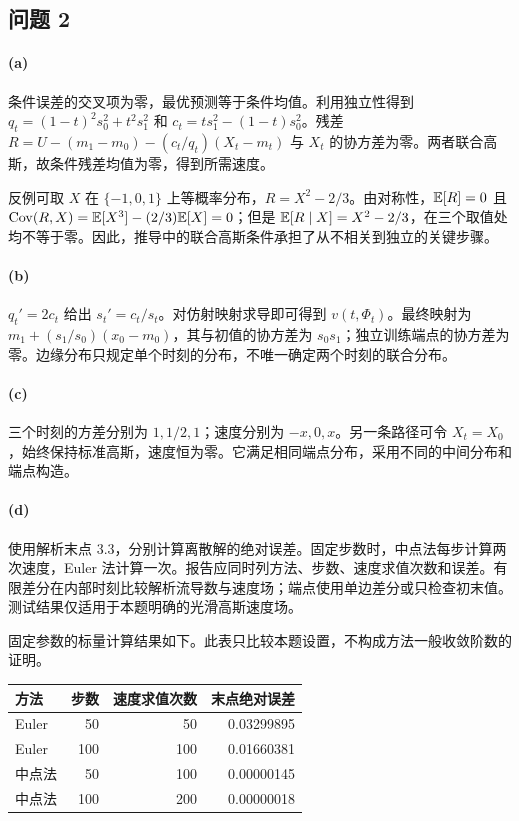 \subsection*{问题 2}
\paragraph{(a)}\label{sol:flow-a}
条件误差的交叉项为零，最优预测等于条件均值。利用独立性得到 $q_t=(1-t)^2s_0^2+t^2s_1^2$ 和 $c_t=ts_1^2-(1-t)s_0^2$。残差 $R=U-(m_1-m_0)-(c_t/q_t)(X_t-m_t)$ 与 $X_t$ 的协方差为零。两者联合高斯，故条件残差均值为零，得到所需速度。

反例可取 $X$ 在 $\{-1,0,1\}$ 上等概率分布，$R=X^2-2/3$。由对称性，$\mathbb E[R]=0$ 且 $\operatorname{Cov}(R,X)=\mathbb E[X^3]-(2/3)\mathbb E[X]=0$；但是 $\mathbb E[R\mid X]=X^2-2/3$，在三个取值处均不等于零。因此，推导中的联合高斯条件承担了从不相关到独立的关键步骤。

\paragraph{(b)}\label{sol:flow-b}
$q_t'=2c_t$ 给出 $s_t'=c_t/s_t$。对仿射映射求导即可得到 $v(t,\Phi_t)$。最终映射为 $m_1+(s_1/s_0)(x_0-m_0)$，其与初值的协方差为 $s_0s_1$；独立训练端点的协方差为零。边缘分布只规定单个时刻的分布，不唯一确定两个时刻的联合分布。

\paragraph{(c)}\label{sol:flow-c}
三个时刻的方差分别为 $1,1/2,1$；速度分别为 $-x,0,x$。另一条路径可令 $X_t=X_0$，始终保持标准高斯，速度恒为零。它满足相同端点分布，采用不同的中间分布和端点构造。

\paragraph{(d)}\label{sol:flow-d}
使用解析末点 $3.3$，分别计算离散解的绝对误差。固定步数时，中点法每步计算两次速度，Euler 法计算一次。报告应同时列方法、步数、速度求值次数和误差。有限差分在内部时刻比较解析流导数与速度场；端点使用单边差分或只检查初末值。测试结果仅适用于本题明确的光滑高斯速度场。

固定参数的标量计算结果如下。此表只比较本题设置，不构成方法一般收敛阶数的证明。

\begin{center}
\begin{tabular}{lrrr}
\toprule
方法 & 步数 & 速度求值次数 & 末点绝对误差 \\
\midrule
Euler & 50 & 50 & 0.03299895 \\
Euler & 100 & 100 & 0.01660381 \\
中点法 & 50 & 100 & 0.00000145 \\
中点法 & 100 & 200 & 0.00000018 \\
\bottomrule
\end{tabular}
\end{center}

